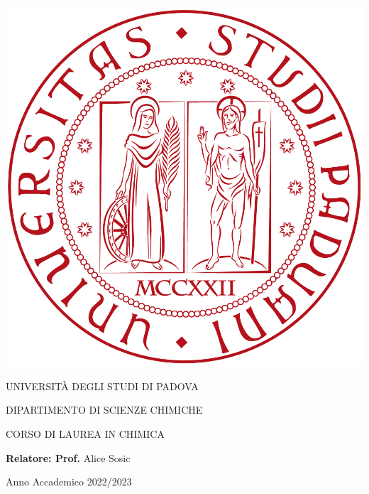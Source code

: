 \begin{fullpaper}
\begingroup
\thispagestyle{empty}
\sffamily \large
\begin{center}
 \bfseries
\includegraphics[scale=0.1]{Immagini/logo.png}\par
\vspace{5mm}
{\color{Primary} UNIVERSITÀ DEGLI STUDI DI PADOVA}\par
\vspace{10mm}
DIPARTIMENTO DI SCIENZE CHIMICHE\par
\vspace{10mm}
CORSO DI LAUREA IN CHIMICA\par
\vspace{20mm}
{\Large \MakeUppercase{\printitle}}
\end{center}
\vspace{25mm}
\raggedright{\normalsize \textbf{Relatore: Prof. }Alice Sosic}\par
\vspace{25mm}
\vfill
\begin{center}
{\normalsize Anno Accademico 2022/2023}
\end{center}
\endgroup
\cleardoublepage
\end{fullpaper}

\endinput
